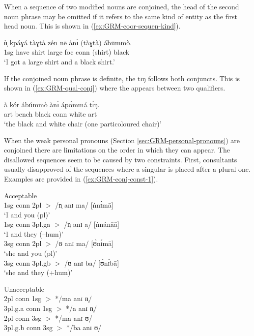\begin{exe}
\begin{exe}
\begin{exe}
\begin{exe}
\begin{exe}
\begin{exe}
\begin{exe}
\begin{exe}
\begin{exe}
\begin{exe}
When a sequence of  two  modified nouns are conjoined, the head of the second
noun phrase may be omitted if it refers to the same kind of entity as
the first head noun. This is shown in (\ref{ex:GRM-coor-sequen-kind}).


 \ea\label{ex:GRM-coor-sequen-kind}
 \gll ǹ̩ kpáɣá tàɣtà zén nē ànɪ́ (tàɣtà) ábūmmò.\\
{\sc 1sg} have shirt large  {\sc foc} {\sc conn} (shirt)  black\\
 \glt   `I got a large shirt and a black shirt.'
\z

If the conjoined noun phrase is definite, the  {\sls tɪŋ}
follows both conjuncts. This is shown in (\ref{ex:GRM-qual-conj}) where the
 appears between two qualifiers.

 \ea\label{ex:GRM-qual-conj}
 \gll   à kór ábúmmò ànɪ́ ápʊ̀mmá tɪ̀ŋ.\\
{\sc art}  bench black {\sc conn} white {\sc art}\\
 \glt   `the black and white chair (one particoloured chair)'
\z

When the weak personal pronouns (Section \ref{sec:GRM-personal-pronouns}) are conjoined there are limitations on the order in which they can 
appear. The disallowed sequences seem to be caused by two constraints. First, consultants usually 
disapproved of  the sequences where a singular  is placed after a plural one. Examples are 
provided in (\ref{ex:GRM-conj-const-1}).



\ea\label{ex:GRM-conj-const-1}
\ea\label{ex:GRM-conj-const-1-g}{\rm Acceptable}\\
{\sc 1sg  conn 2pl} $>$ /{\sls n̩ anɪ ma}/ [ǹnɪ́mā] \\
{\rm `I and you ({\sc pl})'}\\
{\sc 1sg  conn 3pl.g}a  $>$   /{\sls n̩ anɪ a}/ [ǹnánāā]\\
{\rm  `I and they ({\sc --hum})'}\\
{\sc 3sg   conn 2pl} $>$ /{\sls ʊ anɪ ma}/ [ʊ̀nɪ́mā]\\
{\rm   `she and you ({\sc pl})'}\\
{\sc 3sg conn 3pl.g}b $>$   /{\sls ʊ anɪ ba}/ [ʊ̀nɪ́bā]\\
{\rm  `she and they ({\sc +hum})'}


\ex\label{ex:GRM-conj-const-1-ng}{\rm Unacceptable}\\
{\sc  2pl conn 1sg}   $>$ *{\sls /ma  anɪ n̩/}\\
{\sc 3pl.g.}a   {\sc conn 1sg}  $>$  *{\sls /a anɪ n̩/}\\
{\sc  2pl conn 3sg} $>$ */ma anɪ ʊ/\\
{\sc 3pl.g.}b  {\sc conn 3sg} $>$ *{\sls /ba anɪ ʊ/}\\


\end{exe}
\end{exe}
\end{exe}
\end{exe}
\end{exe}
\end{exe}
\end{exe}
\end{exe}
\end{exe}
\end{exe}
